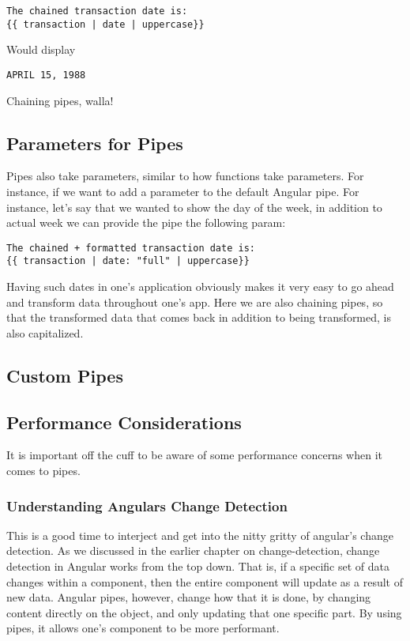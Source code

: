 \begin{lstlisting}
The chained transaction date is:
{{ transaction | date | uppercase}}
\end{lstlisting}

Would display
\begin{verbatim}
APRIL 15, 1988
\end{verbatim}

Chaining pipes, walla!

\subsection{Parameters for Pipes}
Pipes also take parameters, similar to how functions take parameters. For
instance, if we want to add a parameter to the default Angular pipe. For
instance, let's say that we wanted to show the day of the week, in addition to
actual week we can provide the pipe the following param:

\begin{lstlisting}
The chained + formatted transaction date is:
{{ transaction | date: "full" | uppercase}}
\end{lstlisting}

Having such dates in one's application obviously makes it very easy to go ahead
and transform data throughout one's app. Here we are also chaining pipes, so
that the transformed data that comes back in addition to being transformed, is
also capitalized.

\subsection{ Custom Pipes }

\subsection{ Performance Considerations }
It is important off the cuff to be aware of some performance concerns when it
comes to pipes.

\subsubsection{ Understanding Angulars Change Detection }
This is a good time to interject and get into the nitty gritty of angular's
change detection. As we discussed in the earlier chapter on change-detection,
change detection in Angular works from the top down. That is, if a specific set
of data changes within a component, then the entire component will update as a
result of new data. Angular pipes, however, change how that it is done, by
changing content directly on the object, and only updating that one specific
part. By using pipes, it allows one's component to be more performant.

